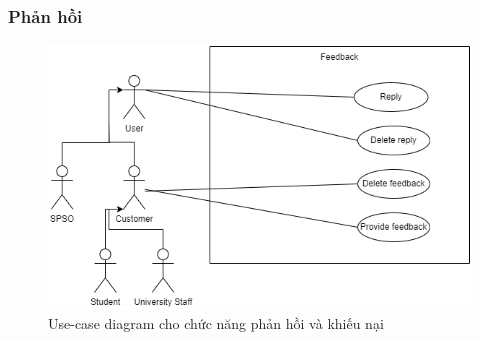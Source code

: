 \subsubsection{Phản hồi}
\begin{figure}[H]
    \begin{center}
        \includegraphics[width=1\textwidth]{Images/Requirement Elicitation/Feedback_Use-case.png}
        \caption{Use-case diagram cho chức năng phản hồi và khiếu nại}
        \label{fig:arch}
    \end{center}
\end{figure}

